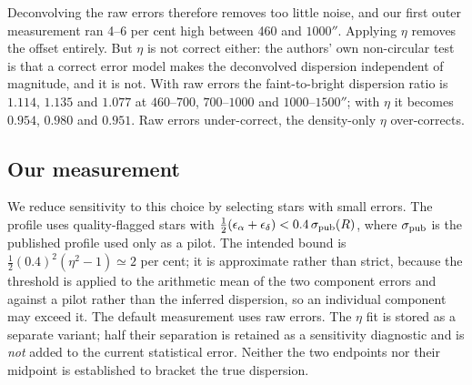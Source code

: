 \documentclass[11pt,a4paper]{article}
\begin{document}
Deconvolving the raw errors therefore removes too little noise, and our first outer
measurement ran 4--6 per cent high between 460 and $1000''$. Applying $\eta$ removes the
offset entirely. But $\eta$ is not correct either: the authors' own non-circular test is that
a correct error model makes the deconvolved dispersion independent of magnitude, and it is
not. With raw errors the faint-to-bright dispersion ratio is $1.114$, $1.135$ and $1.077$ at
$460$--$700$, $700$--$1000$ and $1000$--$1500''$; with $\eta$ it becomes $0.954$, $0.980$ and
$0.951$. Raw errors under-correct, the density-only $\eta$ over-corrects.

\subsection{Our measurement}

We reduce sensitivity to this choice by selecting stars with small errors. The profile uses quality-flagged stars with
$\tfrac12(\epsilon_\alpha+\epsilon_\delta) < 0.4\,\sigma_{\rm pub}(R)$, where
$\sigma_{\rm pub}$ is the published profile used only as a pilot. The intended bound is
$\tfrac12(0.4)^2(\eta^2-1)\simeq2$ per cent; it is approximate rather than strict, because
the threshold is applied to the arithmetic mean of the two component errors and against a
pilot rather than the inferred dispersion, so an individual component may exceed it. The default measurement uses raw errors. The $\eta$ fit is stored as a separate variant;
half their separation is retained as a sensitivity diagnostic and is \emph{not} added to
the current statistical error. Neither the two endpoints nor their midpoint is established
to bracket the true dispersion.
\end{document}
